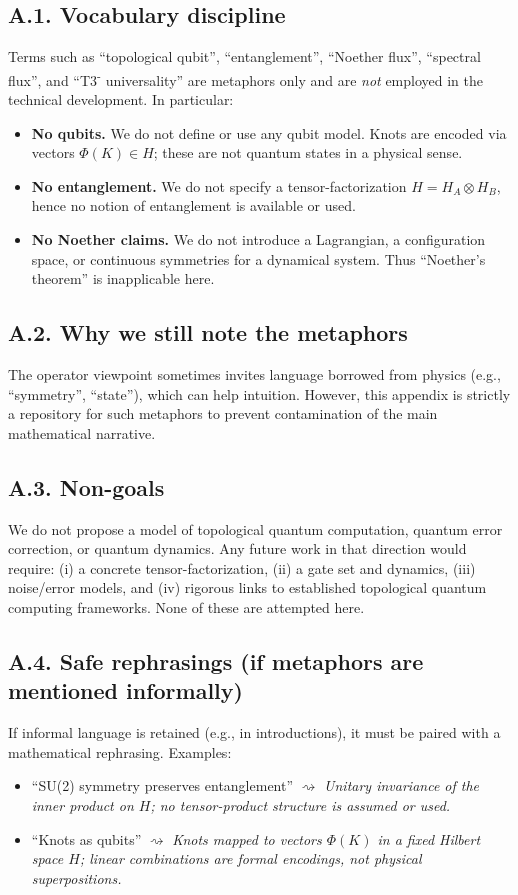 \documentclass[11pt]{article}
\theoremstyle{definition}
\theoremstyle{remark}
\newcommand{\1}{\mathbf{1}}
\begin{document}
\subsection*{A.1. Vocabulary discipline}
Terms such as “topological qubit”, “entanglement”, “Noether flux”, “spectral flux”, and “T3\textsuperscript{-} universality” are metaphors only and are \emph{not} employed in the technical development. In particular:
\begin{itemize}[leftmargin=1.2em]
\item \textbf{No qubits.} We do not define or use any qubit model. Knots are encoded via vectors $\Phi(K)\in H$; these are not quantum states in a physical sense.
\item \textbf{No entanglement.} We do not specify a tensor-factorization $H=H_A\otimes H_B$, hence no notion of entanglement is available or used.
\item \textbf{No Noether claims.} We do not introduce a Lagrangian, a configuration space, or continuous symmetries for a dynamical system. Thus “Noether’s theorem” is inapplicable here.
\end{itemize}

\subsection*{A.2. Why we still note the metaphors}
The operator viewpoint sometimes invites language borrowed from physics (e.g., “symmetry”, “state”), which can help intuition. However, this appendix is strictly a repository for such metaphors to prevent contamination of the main mathematical narrative.

\subsection*{A.3. Non-goals}
We do not propose a model of topological quantum computation, quantum error correction, or quantum dynamics. Any future work in that direction would require: (i) a concrete tensor-factorization, (ii) a gate set and dynamics, (iii) noise/error models, and (iv) rigorous links to established topological quantum computing frameworks. None of these are attempted here.

\subsection*{A.4. Safe rephrasings (if metaphors are mentioned informally)}
If informal language is retained (e.g., in introductions), it must be paired with a mathematical rephrasing. Examples:
\begin{itemize}[leftmargin=1.2em]
\item “SU(2) symmetry preserves entanglement” $\rightsquigarrow$ \emph{Unitary invariance of the inner product on $H$; no tensor-product structure is assumed or used.}
\item “Knots as qubits” $\rightsquigarrow$ \emph{Knots mapped to vectors $\Phi(K)$ in a fixed Hilbert space $H$; linear combinations are formal encodings, not physical superpositions.}
\end{itemize}
\end{document}
